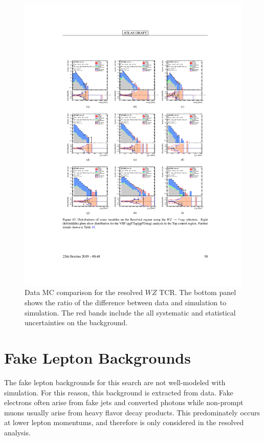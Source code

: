 \begin{figure}[h!]
  \centering
  \includegraphics[width=\hsize , height=\textheight , keepaspectratio]{figures/Analysis/datamc/resolved_wz_tcr.pdf}
      \caption{Data MC comparison for the resolved $WZ$ TCR. The bottom panel shows the ratio of the difference between data and simulation to simulation. The red bands include the all systematic and statistical uncertainties on the background. } 
  \label{fig:resolved_wz_TCR_datamc}
\end{figure} 
\FloatBarrier
\section{Fake Lepton Backgrounds}
\label{fakelep}
The fake lepton backgrounds for this search are not well-modeled with simulation. For this reason, this background is extracted from data. Fake electrons often arise from fake jets and converted photons while non-prompt muons usually arise from heavy flavor decay products. This predominately occurs at lower lepton momentums, and therefore is only considered in the resolved analysis.

